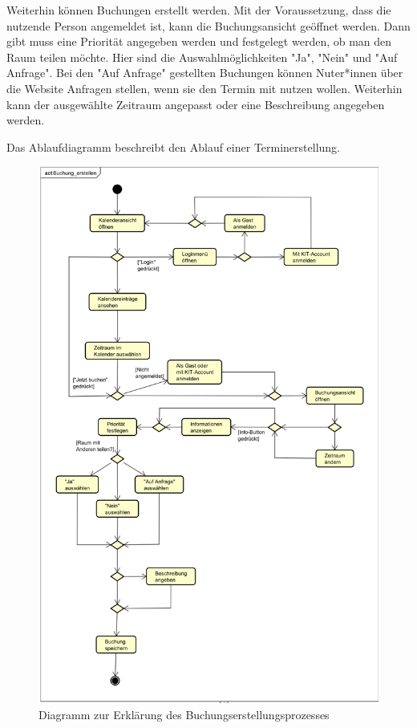  Weiterhin können Buchungen erstellt werden. Mit der Voraussetzung, dass die nutzende Person angemeldet ist,
kann die Buchungsansicht geöffnet werden. Dann gibt muss eine Priorität angegeben werden und festgelegt werden,
 ob man den Raum teilen möchte. Hier sind die Auswahlmöglichkeiten "Ja", "Nein" und "Auf Anfrage". Bei den "Auf
 Anfrage" gestellten Buchungen können Nuter*innen über die Website Anfragen stellen, wenn sie den Termin mit nutzen
 wollen. Weiterhin kann der ausgewählte Zeitraum angepasst oder eine Beschreibung angegeben werden.

 Das Ablaufdiagramm beschreibt den Ablauf einer Terminerstellung.

\begin{figure}[ht]
    \centering
    \includegraphics[width=\textwidth]{figures/activity/buchungerstellen}
    \caption{Diagramm zur Erklärung des Buchungserstellungsprozesses}
    \label{fig:make-booking-diagram}
\end{figure}

